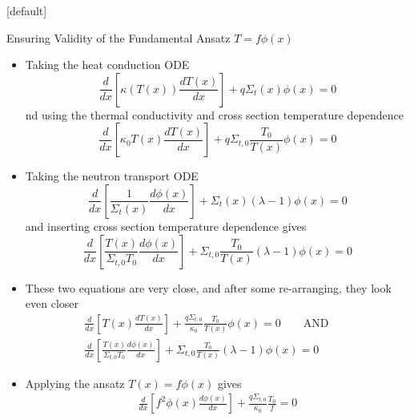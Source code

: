 \documentclass[9pt,t,aspectratio=169]{beamer}
\makeatletter
\newcommand{\QAND}{\qquad \text{AND} \qquad}
\newenvironment{withoutheadline}{
       \setbeamertemplate{headline}[default]
       \def\beamer@entrycode{\vspace*{-\headheight}}
    }{}
\makeatother
\begin{document}
\begin{withoutheadline}
    \begin{frame}[allowframebreaks]{Ensuring Validity of the Fundamental Ansatz $T=f\phi(x)$}
        \begin{itemize}
            \item Taking the heat conduction ODE
            \begin{equation}
                \frac{d}{dx}\left\lbrack\kappa(T(x))\frac{dT(x)}{dx}\right\rbrack + q \Sigma_{t}(x)\phi(x) = 0
            \end{equation}
            nd using the thermal conductivity and cross section temperature dependence
            \begin{equation}
                \frac{d}{dx}\left\lbrack\kappa_{0} T(x)\frac{dT(x)}{dx}\right\rbrack + q\Sigma_{t,0}\frac{T_{0}}{T(x)}\phi(x) = 0
            \end{equation}
            \item Taking the neutron transport ODE
            \begin{equation}
                \frac{d}{dx}\left\lbrack\frac{1}{\Sigma_{t}(x)} \frac{d\phi(x)}{dx} \right\rbrack + \Sigma_{t}(x)
                \left(\lambda - 1\right)\phi(x) = 0
            \end{equation}
            and inserting cross section temperature dependence gives
            \begin{equation}
                \frac{d}{dx}\left\lbrack  \frac{T(x)}{\Sigma_{t,0}T_{0}} \frac{d\phi(x)}{dx} \right\rbrack + \Sigma_{t,0}\frac{T_{0}}{T(x)}
                \left(\lambda - 1\right)\phi(x) = 0
            \end{equation}
            \item These two equations are very close, and after some re-arranging, they look even closer
            \begin{multline}
                \frac{d}{dx}\left\lbrack T(x)\frac{dT(x)}{dx}\right\rbrack + \frac{q\Sigma_{t,0}}{\kappa_{0}}\frac{T_{0}}{T(x)}\phi(x) = 0
                \QAND \\
                \frac{d}{dx}\left\lbrack  \frac{T(x)}{\Sigma_{t,0}T_{0}} \frac{d\phi(x)}{dx} \right\rbrack + \Sigma_{t,0}\frac{T_{0}}{T(x)}
                \left(\lambda - 1\right)\phi(x) = 0
            \end{multline}
            \item Applying the ansatz $T(x) = f\phi(x)$ gives
            \begin{multline}
                \frac{d}{dx}\left\lbrack f^2\phi(x)\frac{d\phi(x)}{dx}\right\rbrack + \frac{q\Sigma_{t,0}}{\kappa_{0}}\frac{T_{0}}{f} = 0

\end{multline}
\end{itemize}
\end{frame}
\end{withoutheadline}
\end{document}
